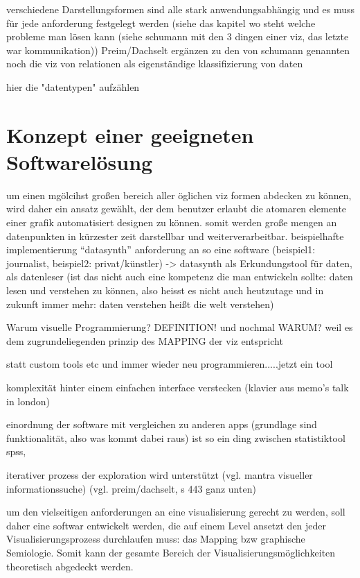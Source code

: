 \documentclass[a4paper, 12pt, onepage, pdftex, headsepline, footsepline]{scrreprt}
\begin{document}
verschiedene Darstellungsformen
sind alle stark anwendungsabhängig und es muss für jede anforderung festgelegt werden (siehe das kapitel wo steht welche probleme man lösen kann (siehe schumann mit den 3 dingen einer viz, das letzte war kommunikation))
Preim/Dachselt ergänzen zu den von schumann genannten noch die viz von relationen als eigenständige klassifizierung von daten

hier die "datentypen" aufzählen

\chapter{Konzept einer geeigneten Softwarelösung}
um einen mgölcihst großen bereich aller öglichen viz formen abdecken zu können, wird daher ein ansatz gewählt, der dem benutzer erlaubt die atomaren elemente einer grafik automatisiert designen zu können. somit werden große mengen an datenpunkten in kürzester zeit darstellbar und weiterverarbeitbar.
beispielhafte implementierung “datasynth”
anforderung an so eine software (beispiel1: journalist, beispiel2: privat/künstler)
-> datasynth als Erkundungstool für daten, als datenleser (ist das nicht auch eine kompetenz die man entwickeln sollte: daten lesen und verstehen zu können, also heisst es nicht auch heutzutage und in zukunft immer mehr: daten verstehen heißt die welt verstehen)

Warum visuelle Programmierung? DEFINITION! und nochmal WARUM?
weil es dem zugrundeliegenden prinzip des MAPPING der viz entspricht

statt custom tools etc und immer wieder neu programmieren.....jetzt ein tool

komplexität hinter einem einfachen interface verstecken (klavier aus memo’s talk in london)

einordnung der software mit vergleichen zu anderen apps (grundlage sind funktionalität, also was kommt dabei raus) ist so ein ding zwischen statistiktool spss, 

iterativer prozess der exploration wird unterstützt (vgl. mantra visueller informationssuche) (vgl. preim/dachselt, s 443 ganz unten)

um den vielseitigen anforderungen an eine visualisierung gerecht zu werden, soll daher eine softwar entwickelt werden, die auf einem Level ansetzt den jeder Visualisierungsprozess durchlaufen muss: das Mapping bzw graphische Semiologie. Somit kann der gesamte Bereich der Visualisierungsmöglichkeiten theoretisch abgedeckt werden.
\end{document}
